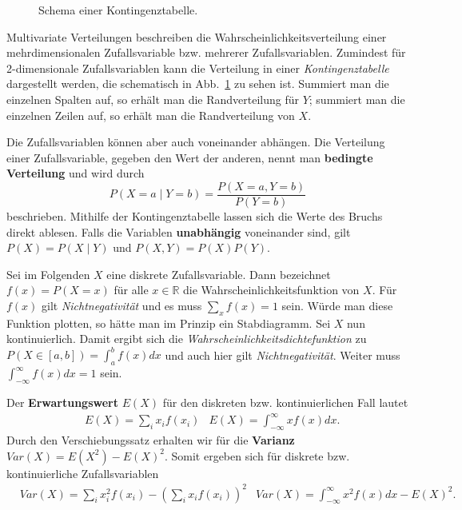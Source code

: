 \begin{figure}[hb]
	\centering
	
	\caption[Schema Kontingenztabelle]{Schema einer Kontingenztabelle.}
	\label{fig:contingency_ex}
\end{figure}

Multivariate Verteilungen beschreiben die Wahrscheinlichkeitsverteilung einer mehrdimensionalen Zufallsvariable bzw. mehrerer Zufallsvariablen. Zumindest für 2-dimensionale Zufallsvariablen kann die Verteilung in einer \textit{Kontingenztabelle} dargestellt werden, die schematisch in Abb.~\ref{fig:contingency_ex} zu sehen ist. Summiert man die einzelnen Spalten auf, so erhält man die Randverteilung für \(Y\); summiert man die einzelnen Zeilen auf, so erhält man die Randverteilung von \(X\).

Die Zufallsvariablen können aber auch voneinander abhängen. Die Verteilung
einer Zufallsvariable, gegeben den Wert der anderen, nennt man \textbf{bedingte
Verteilung} und wird durch
\[
	P(X=a \mid Y=b)=\frac{P(X=a,Y=b)}{P(Y=b)}
\]
beschrieben. Mithilfe der Kontingenztabelle lassen sich die Werte des Bruchs direkt ablesen. Falls die Variablen \textbf{unabhängig} voneinander sind, gilt \(P(X) = P(X \mid Y)\) und \(P(X,Y) = P(X)P(Y)\).

Sei im Folgenden \(X\) eine diskrete Zufallsvariable. Dann bezeichnet \(f(x)=P(X=x)\) für alle \(x\in\mathbb{R}\) die Wahrscheinlichkeitsfunktion von \(X\). Für \(f(x)\) gilt \textit{Nichtnegativität} und es muss \(\sum_x f(x) = 1\) sein. Würde man diese Funktion plotten, so hätte man im Prinzip ein Stabdiagramm.
Sei \(X\) nun kontinuierlich. Damit ergibt sich die \textit{Wahrscheinlichkeitsdichtefunktion} zu \(P(X\in[a,b])=\int_{a}^{b} f(x)dx\) und auch hier gilt \textit{Nichtnegativität}. Weiter muss \(\int_{-\infty}^{\infty} f(x)dx = 1\) sein.

Der \textbf{Erwartungswert} \(E(X)\) für den diskreten bzw. kontinuierlichen Fall lautet
\begin{align*}
	&E(X)=\sum\nolimits_{i} x_i f(x_i) &E(X) = \int_{-\infty}^{\infty}xf(x)dx.
\end{align*}
Durch den Verschiebungssatz erhalten wir für die \textbf{Varianz} \(Var(X)=E(X^2)-E(X)^2\). Somit ergeben sich für diskrete bzw. kontinuierliche Zufallsvariablen
\begin{align*}
	&Var(X)=\sum\nolimits_i x_i^2 f(x_i) - (\sum\nolimits_i x_i f(x_i))^2&Var(X)=\int_{-\infty}^{\infty} x^2f(x)dx - E(X)^2.
\end{align*}

